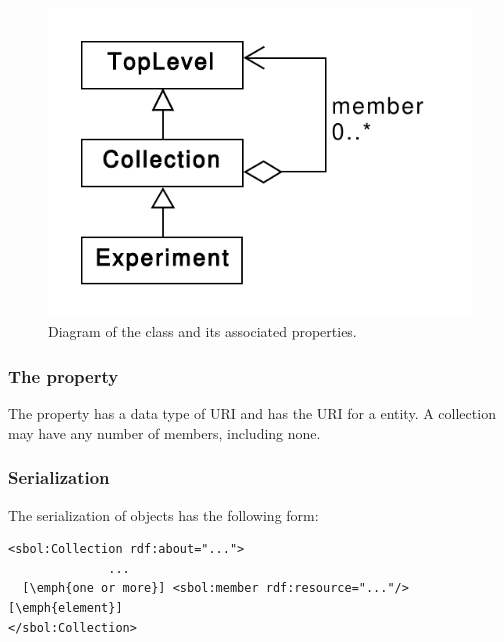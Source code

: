 \begin{figure}[ht]
\begin{center}
\includegraphics[scale=0.6]{uml/collection}
\caption[]{Diagram of the  class and its associated properties.}
\label{uml:collection}
\end{center}
\end{figure}

\subsubsection*{The  property}
The  property has a data type of URI and has the URI for a  entity.  A collection may have any number of members, including none.

\subsubsection*{Serialization}

The serialization of  objects has the following form:

\begin{lstlisting}
<sbol:Collection rdf:about="...">
              ...
  [\emph{one or more}] <sbol:member rdf:resource="..."/> [\emph{element}]
</sbol:Collection>
\end{lstlisting}


